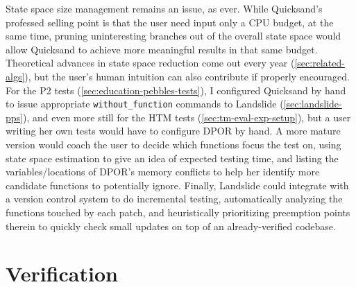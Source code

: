 State space size management remains an issue, as ever.
While Quicksand's professed selling point is that the user need input only a CPU budget,
at the same time,
pruning uninteresting branches out of the overall state space
would allow Quicksand to achieve more meaningful results in that same budget.
Theoretical advances in state space reduction come out every year (\cref{sec:related-algs}),
but the user's human intuition can also contribute if properly encouraged.
For the P2 tests (\cref{sec:education-pebbles-tests}),
I configured Quicksand by hand to issue appropriate {\tt without\_function} commands to Landslide
(\cref{sec:landslide-pps}),
and even more still for the HTM tests (\cref{sec:tm-eval-exp-setup}),
but a user writing her own tests would have to configure DPOR by hand.
A more mature version would coach the user to decide which functions focus the test on,
using state space estimation to give an idea of expected testing time,
and listing the variables/locations of DPOR's memory conflicts
to help her identify more candidate functions to potentially ignore.
Finally, Landslide could integrate with a version control system to do incremental testing,
automatically analyzing the functions touched by each patch,
and heuristically prioritizing preemption points therein
to quickly check small updates on top of an already-verified codebase.

\section{Verification}

